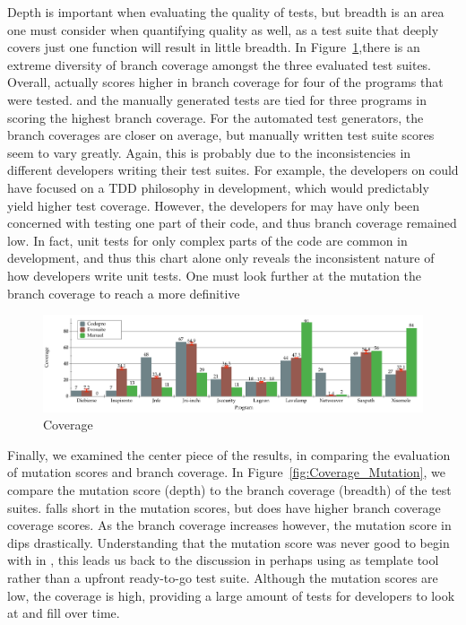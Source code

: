Depth is important when evaluating the quality of tests, but breadth is an area one must consider when quantifying quality as well, as a test suite that deeply covers just one function will result in little breadth. In Figure~\ref{fig:Coverage},there is an extreme diversity of branch coverage amongst the three evaluated test suites. Overall, \codepro actually scores higher in branch coverage for four of the programs that were tested. \evo and the manually generated tests are tied for three programs in scoring the highest branch coverage. For the automated test generators, the branch coverages are closer on average, but manually written test suite scores seem to vary greatly. Again, this is probably due to the inconsistencies in different developers writing their test suites. For example, the developers on \lavalamp could have focused on a TDD philosophy in development, which would predictably yield higher test coverage. However, the developers for \netweaver may have only been concerned with testing one part of their code, and thus branch coverage remained low. In fact, unit tests for only complex parts of the code are common in development, and thus this chart alone only reveals the inconsistent nature of how developers write unit tests. One must look further at the mutation the branch coverage to reach a more definitive 

\begin{figure}[!t]
\centering
  \includegraphics[width=\textwidth]{Coverage}
    \caption{Coverage}
  \label{fig:Coverage}
\end{figure}

Finally, we examined the center piece of the results, in comparing the evaluation of mutation scores and branch coverage. In Figure~\ref{fig:Coverage_Mutation}, we compare the mutation score (depth) to the branch coverage (breadth) of the test suites. \codepro falls short in the mutation scores, but does have higher branch coverage coverage scores. As the branch coverage increases however, the mutation score in \codepro dips drastically. Understanding that the mutation score was never good to begin with in \codepro, this leads us back to the discussion in perhaps using \codepro as template tool rather than a upfront ready-to-go test suite. Although the mutation scores are low, the coverage is high, providing a large amount of tests for developers to look at and fill over time. 

